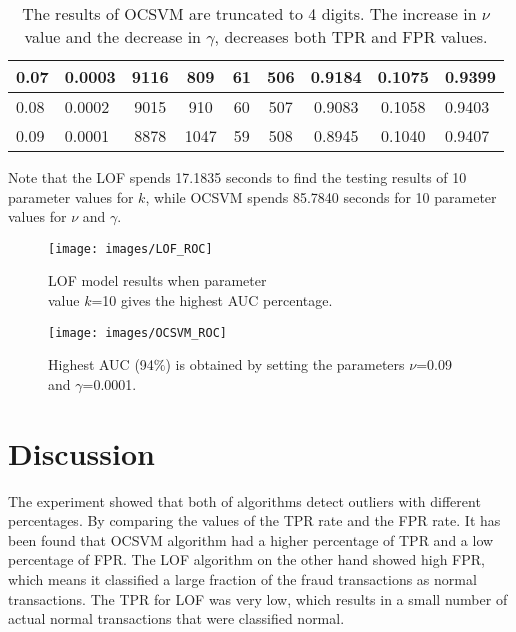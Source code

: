 \begin{table}[H]
\begin{tabular}{|l|l|c|c|c|c|c|c|l|}
0.07  & 0.0003                                                & 9116        & 809         & 61          & 506         & 0.9184       & 0.1075       & 0.9399       \\ \hline
0.08  & 0.0002                                                & 9015        & 910         & 60          & 507         & 0.9083       & 0.1058       & 0.9403       \\ \hline
0.09  & 0.0001                                                & 8878        & 1047        & 59          & 508         & 0.8945       & 0.1040       & 0.9407       \\ \hline
\end{tabular}
\vspace{1em}
\caption{The results of OCSVM are truncated to 4 digits. The increase in $\nu$ value and the decrease in $\gamma$, decreases both TPR and FPR values.}\label{tab:myOCSVM}
\end{table}

Note that the LOF spends 17.1835 seconds to find the testing results of 10 parameter values for $k$, while OCSVM spends 85.7840 seconds for 10 parameter values for $\nu$ and $\gamma$.

\begin{figure}[H]
\begin{center}
  \texttt{[image: images/LOF\_ROC]}
  \caption{LOF model results when parameter \\value $k$=10 gives the highest AUC percentage.}
  \label{LOF_TPR_FPR}
  \vspace{-1.5em}
\endminipage
{}
  \texttt{[image: images/OCSVM\_ROC]}
  \caption{Highest AUC (94$\%$) is obtained by setting the parameters $\nu$=0.09 and $\gamma$=0.0001.}
  \label{OCSVM_TPR_FPR}
  \vspace{-1.5em}
\endminipage
\end{center}
\end{figure}

\section{Discussion}
The experiment showed that both of algorithms detect outliers with different percentages. By comparing the values of the TPR rate and the FPR rate. It has been found that OCSVM algorithm had a higher percentage of TPR and a low percentage of FPR. The LOF algorithm on the other hand showed high FPR, which means it classified a large fraction of the fraud transactions as normal transactions. The TPR for LOF was very low, which results in a small number of actual normal transactions that were classified normal.

